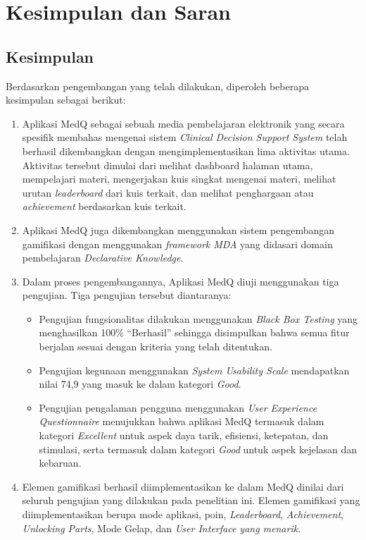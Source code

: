 \chapter{Kesimpulan dan Saran}

\section{Kesimpulan}

Berdasarkan pengembangan yang telah dilakukan, diperoleh beberapa kesimpulan sebagai berikut:
\begin{enumerate}
    \item Aplikasi MedQ sebagai sebuah media pembelajaran elektronik yang secara spesifik membahas mengenai sistem \textit{Clinical Decision Support System} telah berhasil dikembangkan dengan mengimplementasikan lima aktivitas utama.
    Aktivitas tersebut dimulai dari melihat dashboard halaman utama, mempelajari materi, mengerjakan kuis singkat mengenai materi, melihat urutan \textit{leaderboard} dari kuis terkait, dan melihat penghargaan atau \textit{achievement} berdasarkan kuis terkait.
    \item Aplikasi MedQ juga dikembangkan menggunakan sistem pengembangan gamifikasi dengan menggunakan \textit{framework MDA} yang didasari domain pembelajaran \textit{Declarative Knowledge}. 
    \item Dalam proses pengembangannya, Aplikasi MedQ diuji menggunakan tiga pengujian. Tiga pengujian tersebut diantaranya:
    \begin{itemize}
        \item Pengujian fungsionalitas dilakukan menggunakan \textit{Black Box  Testing} yang menghasilkan 100\% “Berhasil” sehingga disimpulkan bahwa semua fitur berjalan sesuai dengan kriteria yang telah ditentukan. 
        \item Pengujian kegunaan menggunakan \textit{System Usability Scale} mendapatkan nilai 74,9 yang masuk ke dalam kategori \textit{Good}.
        \item Pengujian pengalaman pengguna menggunakan \textit{User Experience Questionnaire} menujukkan bahwa aplikasi MedQ termasuk dalam kategori \textit{Excellent} untuk aspek daya tarik, efisiensi, ketepatan, dan stimulasi, serta termasuk dalam kategori \textit{Good} untuk aspek kejelasan dan kebaruan. 
    \end{itemize}
    \item Elemen gamifikasi berhasil diimplementasikan ke dalam MedQ dinilai dari seluruh pengujian yang dilakukan pada penelitian ini. Elemen gamifikasi yang diimplementasikan berupa mode aplikasi, poin, \textit{Leaderboard}, \textit{Achievement}, \textit{Unlocking Parts}, Mode Gelap, dan \textit{User Interface yang menarik}.
\end{enumerate}
\newpage
